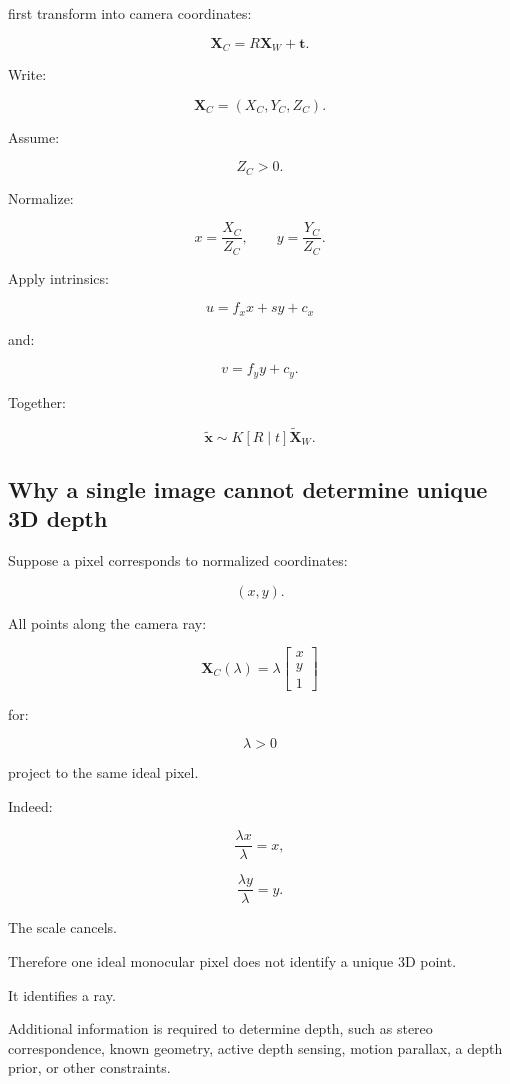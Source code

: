 first transform into camera coordinates:

\[
 \boxed{ \mathbf X_C=R\mathbf X_W+\mathbf t }.
\]

Write:

\[
 \mathbf X_C=(X_C,Y_C,Z_C).
\]

Assume:

\[
 Z_C>0.
\]

Normalize:

\[
 \boxed{ x=\frac{X_C}{Z_C}, \qquad y=\frac{Y_C}{Z_C} }.
\]

Apply intrinsics:

\[
 \boxed{ u=f_xx+sy+c_x }
\]

and:

\[
 \boxed{ v=f_yy+c_y }.
\]

Together:

\[
 \boxed{ \tilde{\mathbf x} \sim K[R\mid t]\tilde{\mathbf X}_W }.
\]

\subsection{Why a single image cannot determine unique 3D depth}\label{02-foundations-ii-ch035-why-a-single-image-cannot-determine-unique-3d-depth}

Suppose a pixel corresponds to normalized coordinates:

\[
 (x,y).
\]

All points along the camera ray:

\[
 \boxed{ \mathbf X_C(\lambda)= \lambda \begin{bmatrix} x\\y\\1 \end{bmatrix} }
\]

for:

\[
 \lambda>0
\]

project to the same ideal pixel.

Indeed:

\[
 \frac{\lambda x}{\lambda}=x,
\]

\[
 \frac{\lambda y}{\lambda}=y.
\]

The scale cancels.

Therefore one ideal monocular pixel does not identify a unique 3D point.

It identifies a ray.

Additional information is required to determine depth, such as stereo correspondence, known geometry, active depth sensing, motion parallax, a depth prior, or other constraints.

